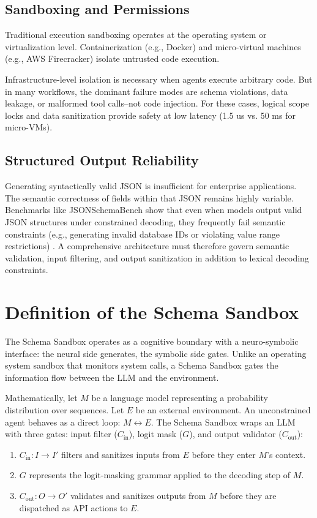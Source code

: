 \documentclass[10pt,journal,compsoc]{IEEEtran}
\begin{document}
\subsection{Sandboxing and Permissions}
Traditional execution sandboxing operates at the operating system or virtualization level. Containerization (e.g., Docker) and micro-virtual machines (e.g., AWS Firecracker) isolate untrusted code execution. 

Infrastructure-level isolation is necessary when agents execute arbitrary code. But in many workflows, the dominant failure modes are schema violations, data leakage, or malformed tool calls--not code injection. For these cases, logical scope locks and data sanitization provide safety at low latency (1.5 us vs. 50 ms for micro-VMs).

\subsection{Structured Output Reliability}
Generating syntactically valid JSON is insufficient for enterprise applications. The semantic correctness of fields within that JSON remains highly variable. Benchmarks like JSONSchemaBench show that even when models output valid JSON structures under constrained decoding, they frequently fail semantic constraints (e.g., generating invalid database IDs or violating value range restrictions) \cite{geng2025}. A comprehensive architecture must therefore govern semantic validation, input filtering, and output sanitization in addition to lexical decoding constraints.


\section{Definition of the Schema Sandbox}
\label{sec:definition}
The Schema Sandbox operates as a cognitive boundary with a neuro-symbolic interface: the neural side generates, the symbolic side gates. Unlike an operating system sandbox that monitors system calls, a Schema Sandbox gates the information flow between the LLM and the environment.

Mathematically, let $M$ be a language model representing a probability distribution over sequences. Let $E$ be an external environment. An unconstrained agent behaves as a direct loop: $M \leftrightarrow E$. The Schema Sandbox wraps an LLM with three gates: input filter ($C_{\text{in}}$), logit mask ($G$), and output validator ($C_{\text{out}}$):
\begin{enumerate}
  \item $C_{\text{in}}: I \rightarrow I'$ filters and sanitizes inputs from $E$ before they enter $M$'s context.
  \item $G$ represents the logit-masking grammar applied to the decoding step of $M$.
  \item $C_{\text{out}}: O \rightarrow O'$ validates and sanitizes outputs from $M$ before they are dispatched as API actions to $E$.
\end{enumerate}
\end{document}
